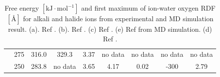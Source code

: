\begin{table}[h]
\begin{centering}
\begin{tabular*}{1\linewidth}{@{\extracolsep{\fill}}ccccccccc}
\addlinespace[-0.33em]
{\scriptsize{}$\mathrm{Rb^{+}}$ } & {\scriptsize{}275} & {\scriptsize{}316.0} & {\scriptsize{}329.3} & {\scriptsize{}3.37} & {\scriptsize{}no data} & {\scriptsize{}no data} & {\scriptsize{}no data} & {\scriptsize{}no data}\tabularnewline
\addlinespace[-0.33em]
{\scriptsize{}$\mathrm{Cs^{+}}$ } & {\scriptsize{}250} & {\scriptsize{}283.8} & {\scriptsize{}no data} & {\scriptsize{}3.65} & {\scriptsize{}4.17} & {\scriptsize{}0.02} & {\scriptsize{}-300} & {\scriptsize{}2.79}\tabularnewline
\bottomrule
\end{tabular*}
\par\end{centering}
\caption[Free energy and first maximum of ion-water oxygen \acs{RDF} for alkali
and halide ions from experimental and \acs{MD} simulation results]{Free energy $[\mathrm{kJ\cdot mol^{-1}}]$ and first maximum of ion-water
oxygen \acs{RDF} $[\textrm{Å}]$ for alkali and halide ions from
experimental and \acs{MD} simulation result. (a). Ref \citep{MARCUS1994111}.
(b). Ref \citep{Noyes_1962}. (c) Ref \citep{tissandier_protons_1998}.
(e) Ref \citep{horinek_rational_2009} from \acs{MD} simulation.
(d) Ref \citep{Marcus_1988}.\label{tab:single-ions}}

\vspace{0.5cm}


\end{table}
